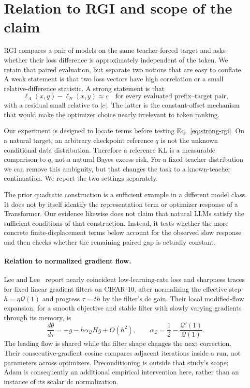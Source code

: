 \section{Relation to RGI and scope of the claim}

RGI compares a pair of models on the same teacher-forced target and asks whether their loss difference is approximately independent of the token.  We retain that paired evaluation, but separate two notions that are easy to conflate.  A weak statement is that two loss vectors have high correlation or a small relative-difference statistic.  A strong statement is that
\begin{equation}
  \ell_A(x,y)-\ell_B(x,y) \approx c
  \quad\text{for every evaluated prefix--target pair,}
  \label{eq:strong-rgi}
\end{equation}
with a residual small relative to \(|c|\).  The latter is the constant-offset mechanism that would make the optimizer choice nearly irrelevant to token ranking.

Our experiment is designed to locate terms before testing Eq.~\eqref{eq:strong-rgi}.  On a natural target, an arbitrary checkpoint reference \(q\) is not the unknown conditional data distribution.  Therefore a reference KL is a measurable comparison to \(q\), not a natural Bayes excess risk.  For a fixed teacher distribution we can remove this ambiguity, but that changes the task to a known-teacher continuation.  We report the two settings separately.

The prior quadratic construction is a sufficient example in a different model class.  It does not by itself identify the representation term or optimizer response of a Transformer.  Our evidence likewise does not claim that natural LLMs satisfy the sufficient conditions of that construction.  Instead, it tests whether the more concrete finite-displacement terms below account for the observed slow response and then checks whether the remaining paired gap is actually constant.

\paragraph{Relation to normalized gradient flow.}
Lee and Lee~\citep{lee2026journeyedgestability} report nearly coincident low-learning-rate loss and sharpness traces for fixed linear gradient filters on CIFAR-10, after normalizing the effective step \(h=\eta\mathcal{Q}(1)\) and progress \(\tau=th\) by the filter's dc gain.  Their local modified-flow expansion, for a smooth objective and stable filter with slowly varying gradients through its memory, is
\begin{equation}
  \frac{d\theta}{d\tau}=-g-h\alpha_{\mathcal{Q}}Hg+O(h^2),
  \qquad \alpha_{\mathcal{Q}}=\frac12-\frac{\mathcal{Q}'(1)}{\mathcal{Q}(1)}.
  \label{eq:filterflow}
\end{equation}
The leading flow is shared while the filter shape changes the next correction.  Their consecutive-gradient cosine compares adjacent iterations inside a run, not parameters across optimizers.  Preconditioning is outside that study's scope; Adam is consequently an additional empirical intervention here, rather than an instance of its scalar dc normalization.

